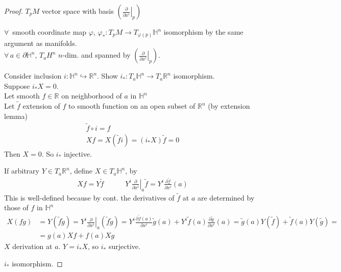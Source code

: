 \begin{proof} $T_pM$ vector space with basis $\left( \left. \frac{ \partial }{ \partial x^i} \right|_p \right)$  

$\forall \, $ smooth coordinate map $\varphi$, $\varphi_* : T_p M \to T_{ \varphi(p)} \mathbb{H}^n$ isomorphism by the same argument as manifolds.  \\
$\forall \, a \in \partial \mathbb{H}^n$, $T_a H^n$ $n$-dim. and spanned by $\left( \left. \frac{ \partial }{ \partial x^i } \right|_p \right)$.  

Consider inclusion $i : \mathbb{H}^n \hookrightarrow \mathbb{R}^n$.  Show $i_*: T_a \mathbb{H}^n \to T_a \mathbb{R}^n$ isomorphism.  \\
Suppose $i_*X =0$.  \\
Let smooth $f \in \mathbb{R}$ on neighborhood of $a$ in $\mathbb{H}^n$ \\
Let $\widetilde{f}$ extension of $f$ to smooth function on an open subset of $\mathbb{R}^n$ (by extension lemma) 
\[
\begin{gathered}
  \widetilde{f} \circ i = f \\ 
  Xf = X(\widetilde{f} i ) = (i_* X)\widetilde{f} = 0
\end{gathered}
\]
Then $X=0$.  So $i_*$ injective.  

If arbitrary $Y \in T_a \mathbb{R}^n$, define $X \in T_a \mathbb{H}^n$, by 
\[
\begin{gathered}
Xf = Y \widetilde{f} \quad \quad \quad Y^i \left. \frac{ \partial }{ \partial x^i} \right|_a \widetilde{f} = Y^i \frac{ \partial \widetilde{f}}{ \partial x^i}(a)
\end{gathered}
\]
This is well-defined because by cont. the derivatives of $\widetilde{f}$ at $a$ are determined by those of $f$ in $\mathbb{H}^n$
\[
\begin{aligned}
  X(fg) & = Y(\widetilde{f} \widetilde{g}) = Y^i \left. \frac{ \partial}{ \partial x^i} \right|_a (\widetilde{f} \widetilde{g}) = Y^i \frac{ \partial \widetilde{f}(a)}{ \partial x^i} \widetilde{g}(a)  + Y^i \widetilde{f}(a) \frac{ \partial \widetilde{g} }{ \partial x^i }(a) = \widetilde{g}(a) Y(\widetilde{f}) + \widetilde{f}(a) Y(\widetilde{g}) = \\ 
  & = g(a) Xf + f(a) Xg
\end{aligned}
\]
$X$ derivation at $a$.  $Y = i_* X$, so $i_*$ surjective.  

$i_*$ isomorphism.  


\end{proof}


